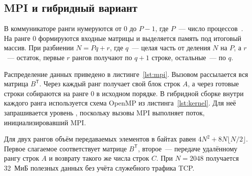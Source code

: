 \subsection{MPI и гибридный вариант}

В коммуникаторе  ранги нумеруются от 0 до $P-1$, где $P$~--- число процессов~\cite{mpi}. На ранге 0 формируются входные матрицы и выделяется память под итоговый массив. При разбиении $N=Pq+r$, где $q$~--- целая часть от деления $N$ на $P$, а $r$~--- остаток, первые $r$ рангов получают по $q+1$ строке, остальные~--- по $q$.

Распределение данных приведено в листинге~\ref{lst:mpi}. Вызовом  рассылается вся матрица $B^\mathsf{T}$. Через  каждый ранг получает свой блок строк $A$, а через  готовые строки собираются на ранге 0 в исходном порядке. В гибридной сборке внутри каждого ранга используется схема OpenMP из листинга~\ref{lst:kernel}. Для неё запрашивается уровень , поскольку вызовы MPI выполняет поток, инициализировавший MPI.

Для двух рангов объём передаваемых элементов в байтах равен $4N^2+8N\lfloor N/2\rfloor$. Первое слагаемое соответствует матрице $B^\mathsf{T}$, второе~--- передаче удалённому рангу строк $A$ и возврату такого же числа строк $C$. При $N=2048$ получается 32~МиБ полезных данных без учёта служебного трафика TCP.
